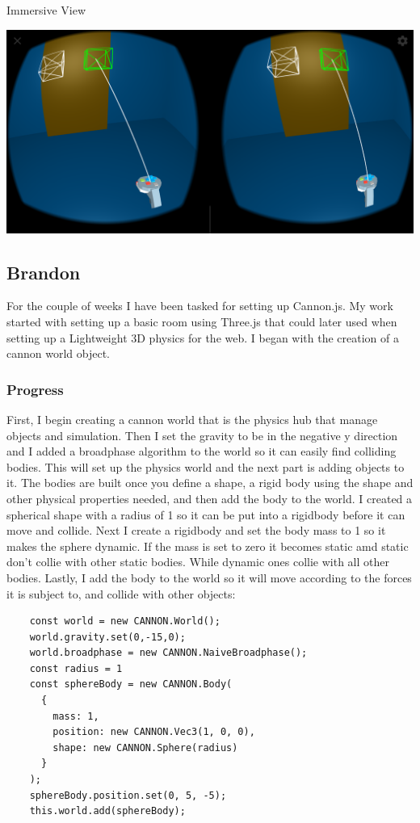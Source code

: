\documentclass[onecolumn, draftclsnofoot,10pt, compsoc]{IEEEtran}
\begin{document}
    Immersive View
    
    \includegraphics[width=\linewidth]{images/ImmersiveView.png}
    
\subsection{Brandon}
   For the couple of weeks I have been tasked for setting up Cannon.js. My work started with setting up a basic room using Three.js that could later used when setting up a Lightweight 3D physics for the web. I began with the creation of a cannon world object.
   
   \subsubsection{Progress}
   First, I begin creating a cannon world that is the physics hub that manage objects and simulation. Then I set the gravity to be in the negative y direction and I added a broadphase algorithm to the world so it can easily find colliding bodies. This will set up the physics world and the next part is adding objects to it. The bodies are built once you define a shape, a rigid body using the shape and other physical properties needed, and then add the body to the world. I created a spherical shape with a radius of 1 so it can be put into a rigidbody before it can move and collide. Next I create a rigidbody and set the body mass to 1 so it makes the sphere dynamic. If the mass is set to zero it becomes static amd static don't collie with other static bodies. While dynamic ones collie with all other bodies. Lastly, I add the body to the world so it will move according to the forces it is subject to, and collide with other objects:
   
   \begin{lstlisting}
    const world = new CANNON.World();
    world.gravity.set(0,-15,0);
    world.broadphase = new CANNON.NaiveBroadphase();
    const radius = 1
    const sphereBody = new CANNON.Body(
      {
        mass: 1,
        position: new CANNON.Vec3(1, 0, 0),
        shape: new CANNON.Sphere(radius)
      }
    );
    sphereBody.position.set(0, 5, -5);
    this.world.add(sphereBody);
   \end{lstlisting}
   
\end{document}
